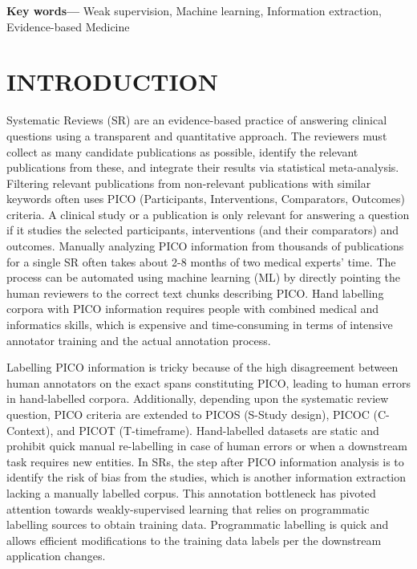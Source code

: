 \documentclass[10.7pt,]{article}
\providecommand{\keywords}[1]
{
  \small	
  \textbf{Key words---} #1
}
\begin{document}
\keywords{Weak supervision, Machine learning, Information extraction, Evidence-based Medicine}
%
\clearpage
%
\section{\textbf{INTRODUCTION}}\label{introduction}
%
Systematic Reviews (SR) are an evidence-based practice of answering clinical questions using a transparent and quantitative approach.
The reviewers must collect as many candidate publications as possible, identify the relevant publications from these, and integrate their results via statistical meta-analysis.
Filtering relevant publications from non-relevant publications with similar keywords often uses PICO (Participants, Interventions, Comparators, Outcomes) criteria. 
A clinical study or a publication is only relevant for answering a question if it studies the selected participants, interventions (and their comparators) and outcomes.\cite{uman2011systematic} 
Manually analyzing PICO information from thousands of publications for a single SR often takes about 2-8 months of two medical experts' time.\cite{borah2017analysis}
The process can be automated using machine learning (ML) by directly pointing the human reviewers to the correct text chunks describing PICO.
Hand labelling corpora with PICO information requires people with combined medical and informatics skills, which is expensive and time-consuming in terms of intensive annotator training and the actual annotation process.

Labelling PICO information is tricky because of the high disagreement between human annotators on the exact spans constituting PICO, leading to human errors in hand-labelled corpora.\cite{brockmeier2019improving}
Additionally, depending upon the systematic review question, PICO criteria are extended to PICOS (S-Study design), PICOC (C-Context), and PICOT (T-timeframe).\cite{riva2012your,methley2014pico,uman2011systematic}
Hand-labelled datasets are static and prohibit quick manual re-labelling in case of human errors or when a downstream task requires new entities.
In SRs, the step after PICO information analysis is to identify the risk of bias from the studies, which is another information extraction lacking a manually labelled corpus. 
This annotation bottleneck has pivoted attention towards weakly-supervised learning that relies on programmatic labelling sources to obtain training data.
Programmatic labelling is quick and allows efficient modifications to the training data labels per the downstream application changes.
\end{document}
